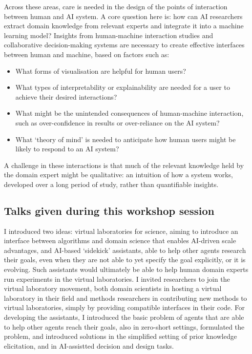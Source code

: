Across these areas, care is needed in the design of the points of
interaction between human and AI system. A core question here is: how
can AI researchers extract domain knowledge from relevant experts and
integrate it into a machine learning model? Insights from human-machine
interaction studies and collaborative decision-making systems are
necessary to create effective interfaces between human and machine,
based on factors such as:

\begin{itemize}
\item
  What forms of visualisation are helpful for human users?
\item
  What types of interpretability or explainability are needed for a user
  to achieve their desired interactions?
\item
  What might be the unintended consequences of human-machine
  interaction, such as over-confidence in results or over-reliance on
  the AI system?
\item
  What `theory of mind' is needed to anticipate how human users might be
  likely to respond to an AI system?
\end{itemize}

A challenge in these interactions is that much of the relevant knowledge
held by the domain expert might be qualitative: an intuition of how a
system works, developed over a long period of study, rather than
quantifiable insights.

\subsection{Talks given during this workshop session}

\license

I introduced two ideas: virtual laboratories for science, aiming to introduce an interface between algorithms and domain science that enables AI-driven scale advantages, and AI-based ‘sidekick’ assistants, able to help other agents research their goals, even when they are not able to yet specify the goal explicitly, or it is evolving. Such assistants would ultimately be able to help human domain experts run experiments in the virtual laboratories. I invited researchers to join the virtual laboratory movement, both domain scientists in hosting a virtual laboratory in their field and methods researchers in contributing new methods to virtual laboratories, simply by providing compatible interfaces in their code. For developing the assistants, I introduced the basic problem of agents that are able to help other agents reach their goals, also in zero-short settings, formulated the problem, and introduced solutions in the simplified setting of prior knowledge elicitation, and in AI-assistted decision and design tasks.

